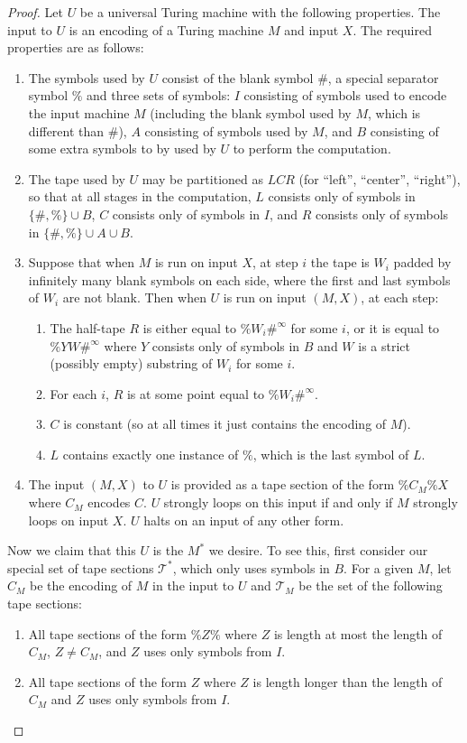 \documentclass{article}
\newcommand{\Tc}{\mathcal{T}}
\begin{document}
\begin{proof}
Let $U$ be a universal Turing machine with the following properties. The input to $U$ is an encoding of a Turing machine $M$ and input $X$. The required properties are as follows:
\begin{enumerate}
    \item The symbols used by $U$ consist of the blank symbol $\#$, a special separator symbol $\%$ and three sets of symbols: $I$ consisting of symbols used to encode the input machine $M$ (including the blank symbol used by $M$, which is different than $\#$), $A$ consisting of symbols used by $M$, and $B$ consisting of some extra symbols to by used by $U$ to perform the computation.
    \item The tape used by $U$ may be partitioned as $LCR$ (for ``left'', ``center'', ``right''), so that at all stages in the computation, $L$ consists only of symbols in $\{\#,\%\}\cup B$, $C$ consists only of symbols in $I$, and $R$ consists only of symbols in $\{\#,\%\}\cup A\cup B$.
    \item Suppose that when $M$ is run on input $X$, at step $i$ the tape is $W_i$ padded by infinitely many blank symbols on each side, where the first and last symbols of $W_i$ are not blank. Then when $U$ is run on input $(M, X)$, at each step:
    \begin{enumerate}
        \item The half-tape $R$ is either equal to $\%W_i\#^\infty$ for some $i$, or it is equal to $\%YW\#^\infty$ where $Y$ consists only of symbols in $B$ and $W$ is a strict (possibly empty) substring of $W_i$ for some $i$.
        \item For each $i$, $R$ is at some point equal to $\%W_i\#^\infty$.
        \item $C$ is constant (so at all times it just contains the encoding of $M$).
        \item $L$ contains exactly one instance of $\%$, which is the last symbol of $L$.
    \end{enumerate}
    \item The input $(M, X)$ to $U$ is provided as a tape section of the form $\% C_M\% X$ where $C_M$ encodes $C$. $U$ strongly loops on this input if and only if $M$ strongly loops on input $X$. $U$ halts on an input of any other form.
\end{enumerate}

Now we claim that this $U$ is the $M^*$ we desire. To see this, first consider our special set of tape sections $\Tc^*$, which only uses symbols in $B$. For a given $M$, let $C_M$ be the encoding of $M$ in the input to $U$ and $\Tc_M$ be the set of the following tape sections:
\begin{enumerate}
    \item All tape sections of the form $\% Z\%$ where $Z$ is length at most the length of $C_M$, $Z\ne C_M$, and $Z$ uses only symbols from $I$.
    \item All tape sections of the form $Z$ where $Z$ is length longer than the length of $C_M$ and $Z$ uses only symbols from $I$.
\end{enumerate}


\end{proof}
\end{document}
